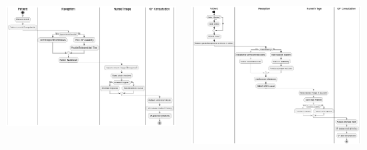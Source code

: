 \documentclass[aspectratio=169, table]{beamer}
\begin{document}
{
	\begin{frame}
		\centering
		\begin{columns}[t]
			\begin{column}{.5\textwidth}
					\includegraphics[width=\textwidth]{../figures/workflow_offline.png}
			\end{column}
			\begin{column}{.5\textwidth}
	\includegraphics[width=\textwidth]{../figures/workflow_online.png}
			\end{column}
		\end{columns}
	\end{frame}
}
\end{document}
